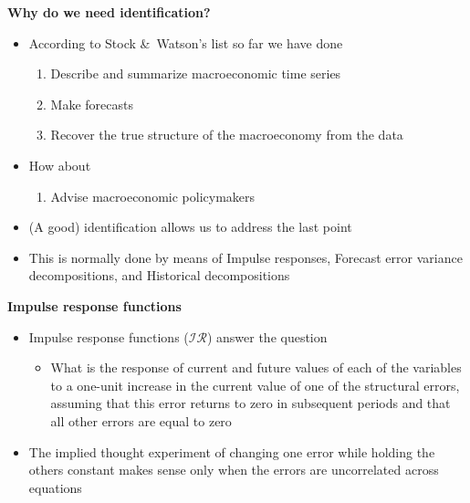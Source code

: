 \documentclass[10pt,handout]{beamer}
\begin{document}
\begin{frame}
{\textbf{Why do we need identification?}}

\begin{itemize}
\item According to Stock \&\ Watson's list so far we have done

\begin{enumerate}
\item Describe and summarize macroeconomic time series

\item Make forecasts

\item Recover the true structure of the macroeconomy from the data\medskip 
\pause
\end{enumerate}

\item How about

\begin{enumerate}
\item Advise macroeconomic policymakers\medskip \pause
\end{enumerate}

\item (A good) identification allows us to address the last point\medskip 
\pause

\item This is normally done by means of {{\color{red} Impulse responses}}, {{%
\color{red} Forecast error variance decompositions}}, and {{\color{red}
Historical decompositions}}
\end{itemize}
\end{frame}

\vspace{.1cm}

\begin{frame}
{\textbf{Impulse response functions}}

\begin{itemize}
\item Impulse response functions ($\mathcal{IR}$) answer the question

\begin{itemize}
\item What is the response of current and future values of each of the
variables to a one-unit increase in the current value of one of the
structural errors, assuming that this error returns to zero in subsequent
periods and that all other errors are equal to zero\medskip \pause
\end{itemize}

\item The implied thought experiment of changing one error while holding the
others constant makes sense only when the errors are uncorrelated across
equations
\end{itemize}
\end{frame}
\end{document}
